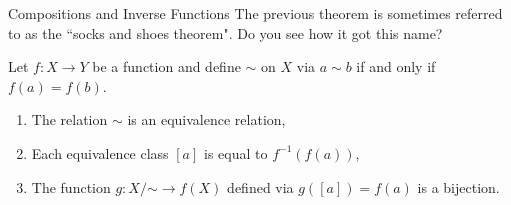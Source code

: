 \begin{section}{Compositions and Inverse Functions}
The previous theorem is sometimes referred to as the ``socks and shoes theorem".  Do you see how it got this name?

\begin{theorem}
Let $f:X\to Y$ be a function and define $\sim$ on $X$ via $a\sim b$ if and only if $f(a) = f(b)$.
\begin{enumerate}[label=\textrm{(\alph*)}]
\item The relation $\sim$ is an equivalence relation,
\item Each equivalence class $[a]$ is equal to $f^{-1}(f(a))$,
\item The function $g:X/\mathord\sim\to f(X)$ defined via $g([a]) = f(a)$ is a bijection.
\end{enumerate}
\end{theorem}

\end{section}